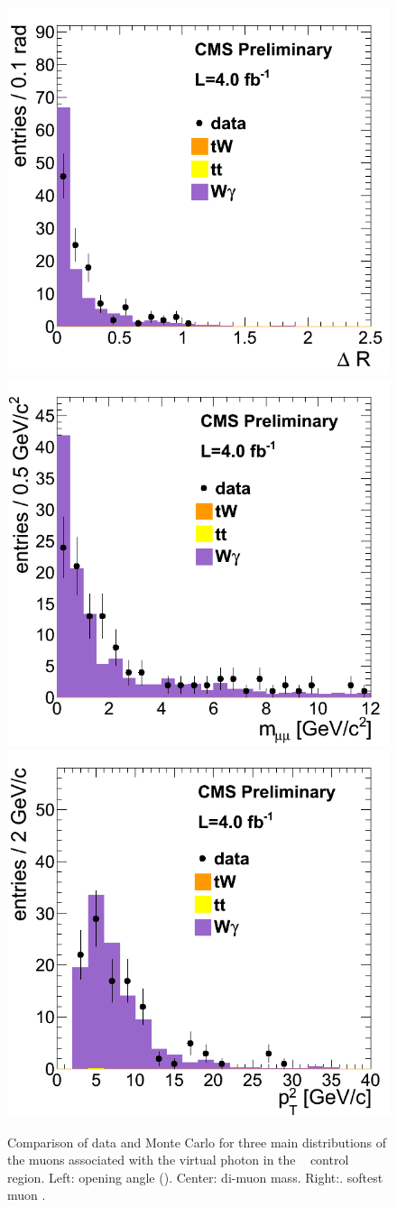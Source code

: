 \begin{figure}[hbt]
\begin{center}
\includegraphics[width=0.3\linewidth]{figures/WGammaStar_dR.png} 
\includegraphics[width=0.3\linewidth]{figures/WGammaStar_mass.png}
\includegraphics[width=0.3\linewidth]{figures/WGammaStar_3rdLep.png}
\caption{\label{fig:WgammaStar}\protect Comparison of data and Monte Carlo for three 
main distributions of the muons associated with the virtual photon in
the \Wgstar~ control region.  Left: opening angle (\delR).  Center:
di-muon mass.  Right:. softest muon \pt.}
\end{center}
\end{figure}

